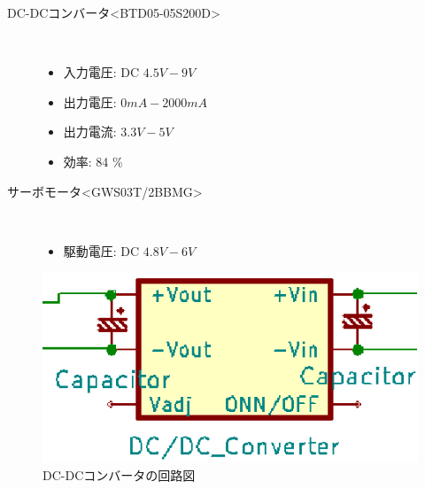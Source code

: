 \begin{description}
    \item[DC-DCコンバータ\textless BTD05-05S200D\textgreater \cite{dcdcconverter}]\mbox{}\\
    \vspace{-5mm}
        \begin{itemize}
            \item 入力電圧: DC $4.5\unit{V}-9\unit{V}$
            \item 出力電圧: $0\unit{mA}-2000\unit{mA}$
            \item 出力電流: $3.3\unit{V}-5\unit{V}$
            \item 効率: 84 \%
        \end{itemize}
     \item[サーボモータ\textless GWS03T/2BBMG\textgreater]\mbox{}\\
    \vspace{-5mm}
         \begin{itemize}
            \item 駆動電圧: DC $4.8\unit{V}-6\unit{V}$
        \end{itemize}
\end{description}


\begin{figure}[h]
\centering
\includegraphics[scale=1.0]{picture/eps/ele_cap.eps}
\caption{DC-DCコンバータの回路図}
\label{fig::ele_cap}
\end{figure}




